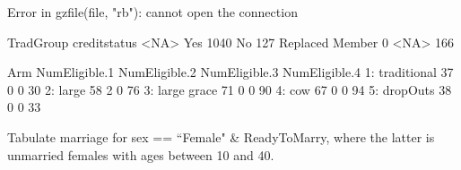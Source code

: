 \begin{Schunk}
\begin{Soutput}
Error in gzfile(file, "rb"): cannot open the connection
\end{Soutput}
\begin{Soutput}
                 TradGroup
creditstatus      <NA>
  Yes             1040
  No               127
  Replaced Member    0
  <NA>             166
\end{Soutput}
\begin{Soutput}
           Arm NumEligible.1 NumEligible.2 NumEligible.3 NumEligible.4
1: traditional            37             0             0            30
2:       large            58             2             0            76
3: large grace            71             0             0            90
4:         cow            67             0             0            94
5:    dropOuts            38             0             0            33
\end{Soutput}
\end{Schunk}
Tabulate marriage for \textsf{sex} == ``Female" \& \textsf{ReadyToMarry}, where the latter is unmarried females with ages between 10 and 40.

